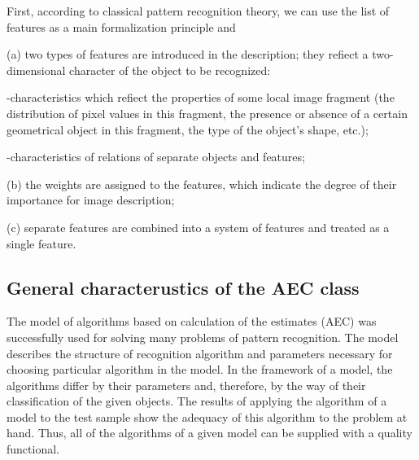First, according to classical pattern recognition theory, 
we can use the list of features as a main formalization principle and 

(a) two types of features are introduced in the description;
they refiect a two-dimensional character of the object to be recognized: 

-characteristics which refiect the properties of some local image fragment 
(the distribution of pixel values in this fragment, the presence or 
absence of a certain geometrical object in this fragment, the type of 
the object's shape, etc.); 

-characteristics of relations of separate objects and features; 

(b) the weights are assigned to the features, which indicate the degree 
of their importance for image description; 

(c) separate features are combined into a system of features and treated 
as a single feature. 

\subsection{General characterustics of the AEC class}

The model of algorithms based on calculation of the estimates 
(AEC) was successfully used for solving many problems of pattern 
recognition. The model describes the structure of recognition 
algorithm and parameters necessary for choosing particular 
algorithm in the model. In the framework of a model, the algorithms 
differ by their parameters and, therefore, by the way of their 
classification of the given objects. The results of applying the 
algorithm of a model to the test sample show the adequacy of this 
algorithm to the problem at hand. Thus, all of the algorithms 
of a given model can be supplied with a quality functional. 

